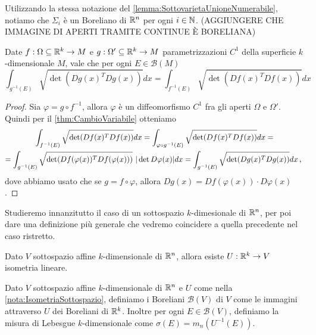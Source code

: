 \begin{remark}
	Utilizzando la stessa notazione del \cref{lemma:SottovarietaUnioneNumerabile}, notiamo che $\Sigma_i$ è un Boreliano di $\mathbb R^n$ per ogni $i\in\mathbb N$. (AGGIUNGERE CHE IMMAGINE DI APERTI TRAMITE CONTINUE È BORELIANA)
\end{remark}

\begin{lemma}
	Date $f:\Omega\subseteq\mathbb R^k\to M$ e $g:\Omega'\subseteq\mathbb R^k\to M$ parametrizzazioni $C^1$ della superficie $k$-dimensionale $M$, vale che per ogni $E\in\mathcal{B}(M)$
	\begin{equation*}
		\int_{g^{-1}(E)}\sqrt{\det(Dg(x)^TDg(x))}dx=\int_{f^{-1}(E)}\sqrt{\det(Df(x)^TDf(x))}dx
	\end{equation*}
\end{lemma}
\begin{proof}
	Sia $\varphi=g\circ f^{-1}$, allora $\varphi$ è un diffeomorfismo $C^1$ fra gli aperti $\Omega$ e $\Omega'$. Quindi per il \cref{thm:CambioVariabile} otteniamo
	\begin{multline*}
		\int_{f^{-1}(E)}\sqrt{\det(Df(x)^TDf(x))}dx=\int_{\varphi\circ g^{-1}(E)}\sqrt{\det(Df(x)^TDf(x))}dx=\\
		=\int_{g^{-1}(E)}\sqrt{\det(Df(\varphi(x))^TDf(\varphi(x)))}\ |\det D\varphi(x)|dx=\int_{g^{-1}(E)}\sqrt{\det(Dg(x)^TDg(x))}dx\virgola
	\end{multline*}
	dove abbiamo usato che se $g=f\circ \varphi$, allora $Dg(x)=Df(\varphi(x))\cdot D\varphi(x)$.

\end{proof}


Studieremo innanzitutto il caso di un sottospazio $k$-dimesionale di $\mathbb R^n$, per poi dare una definizione più generale che vedremo coincidere a quella precedente nel caso ristretto.

\begin{remark}\label{nota:IsometriaSottospazio}
	Dato $V$ sottospazio affine $k$-dimensionale di $\mathbb R^n$, allora esiste $U:\mathbb R^k\to V$ isometria lineare.
\end{remark}

\begin{definition}\label{def:MisuraSottospazio}
	Dato $V$ sottospazio affine $k$-dimensionale di $\mathbb R^n$ e $U$ come nella \cref{nota:IsometriaSottospazio}, definiamo i Boreliani $\mathcal{B}(V)$ di $V$ come le immagini attraverso $U$ dei Boreliani di $\mathbb R^k$. Inoltre per ogni $E\in\mathcal{B}(V)$, definiamo la misura di Lebesgue $k$-dimensionale come $\sigma(E)=m_n(U^{-1}(E))$.
\end{definition}

